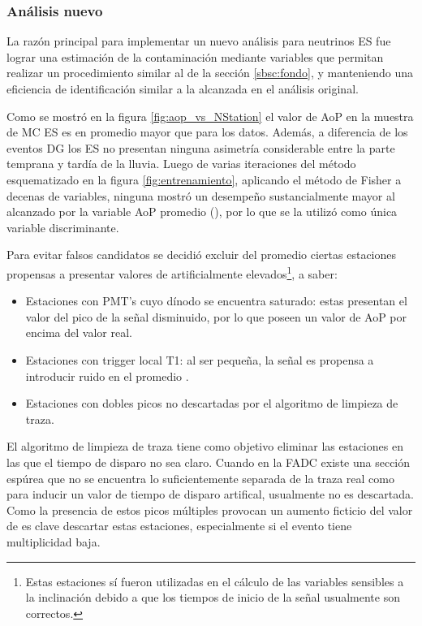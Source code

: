 	\subsubsection{Análisis nuevo}
	
	La razón principal para implementar un nuevo análisis para neutrinos ES fue lograr una estimación de la contaminación mediante variables que permitan realizar un procedimiento similar al de la sección \ref{sbsc:fondo}, y manteniendo una eficiencia de identificación similar a la alcanzada en el análisis original.
	
	Como se mostró en la figura \ref{fig:aop_vs_NStation} el valor de AoP en la muestra de MC ES es en promedio mayor que para los datos.
	Adem\'as, a diferencia de los eventos DG los ES no presentan ninguna asimetría considerable entre la parte temprana y tardía de la lluvia.
	Luego de varias iteraciones del método esquematizado en la figura \ref{fig:entrenamiento}, aplicando el método de Fisher a decenas de variables, ninguna mostr\'o un desempe\~no sustancialmente mayor al alcanzado por la variable AoP promedio (\aop{}), por lo que se la utiliz\'o como \'unica variable discriminante.
	
	Para evitar falsos candidatos se decidió excluir del promedio ciertas estaciones propensas a presentar valores de \aop{} artificialmente elevados\footnote{Estas estaciones sí fueron utilizadas en el cálculo de las variables sensibles a la inclinación debido a que los tiempos de inicio de la señal usualmente son correctos.}, a saber:
	\begin{itemize}
	 \item Estaciones con PMT's cuyo dínodo se encuentra saturado: estas presentan el valor del pico de la señal disminuido, por lo que poseen un valor de AoP por encima del valor real.
	 \item Estaciones con trigger local T1: al ser pequeña, la señal es propensa a introducir ruido en el promedio \aop{}.
	 \item Estaciones con dobles picos no descartadas por el algoritmo de limpieza de traza.
	\end{itemize}
	
	El algoritmo de limpieza de traza tiene como objetivo eliminar las estaciones en las que el tiempo de disparo no sea claro. 
	Cuando en la FADC existe una sección espúrea que no se encuentra lo suficientemente separada de la traza real como para inducir un valor de tiempo de disparo artifical, usualmente no es descartada.
	Como la presencia de estos picos múltiples provocan un aumento ficticio del valor de \aop{} es clave descartar estas estaciones, especialmente si el evento tiene multiplicidad baja.
	
